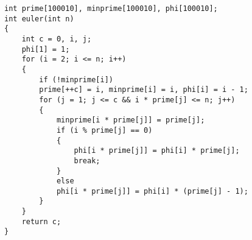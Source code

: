 \documentclass[E:/GsjzTle/main/main.tex]{subfiles}
\begin{document}
\begin{lstlisting}
int prime[100010], minprime[100010], phi[100010];
int euler(int n)
{
	int c = 0, i, j;
	phi[1] = 1;
	for (i = 2; i <= n; i++)
	{
		if (!minprime[i])
		prime[++c] = i, minprime[i] = i, phi[i] = i - 1;
		for (j = 1; j <= c && i * prime[j] <= n; j++)
		{
			minprime[i * prime[j]] = prime[j];
			if (i % prime[j] == 0)
			{
				phi[i * prime[j]] = phi[i] * prime[j];
				break;
			}
			else
			phi[i * prime[j]] = phi[i] * (prime[j] - 1);
		}
	}
	return c;
}
\end{lstlisting}
\end{document}
